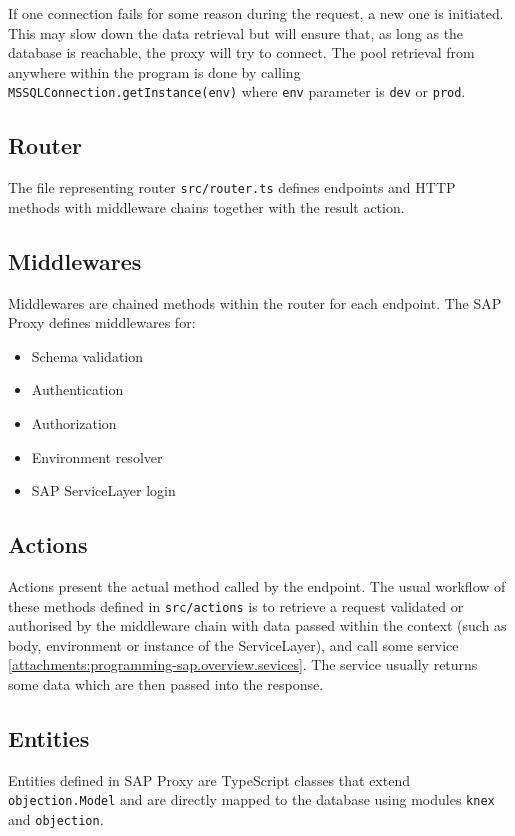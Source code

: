If one connection fails for some reason during the request, a new one is initiated.
This may slow down the data retrieval but will ensure that, as long as the database is reachable, the proxy will try to connect.
The pool retrieval from anywhere within the program is done by calling \texttt{MSSQLConnection.getInstance(env)} where \texttt{env} parameter is \texttt{dev} or \texttt{prod}.

\subsection{Router}
The file representing router \texttt{src/router.ts} defines endpoints and HTTP methods with middleware chains together with the result action.

\subsection{Middlewares}
Middlewares are chained methods within the router for each endpoint.
The SAP Proxy defines middlewares for:
\begin{itemize}
    \item Schema validation
    \item Authentication
    \item Authorization
    \item Environment resolver
    \item SAP ServiceLayer login
\end{itemize}

\subsection{Actions}
Actions present the actual method called by the endpoint.
The usual workflow of these methods defined in \texttt{src/actions} is to retrieve a request validated or authorised by the middleware chain with data passed within the context (such as body, environment or instance of the ServiceLayer), and call some service \ref{attachments:programming-sap.overview.sevices}.
The service usually returns some data which are then passed into the response.

\subsection{Entities}
Entities defined in SAP Proxy are TypeScript classes that extend \texttt{objection.Model} and are directly mapped to the database using modules \texttt{knex} and \texttt{objection}.

